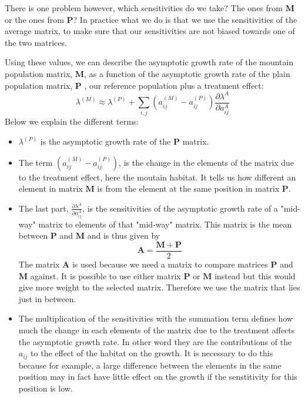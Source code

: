 \documentclass{article}\usepackage[]{graphicx}\usepackage[]{color}
\begin{document}
There is one problem however, which sensitivities do we take? The ones from $\boldsymbol{M}$ or the ones from $\boldsymbol{P}$? In practice what we do is that we use the sensitivities of the average matrix, to make sure that our sensitivities are not biased towards one of the two matrices. 

Using these values, we can describe the asymptotic growth rate of the mountain population matrix, $\boldsymbol{M}$, as a function of the asymptotic growth rate of the plain population matrix, $\boldsymbol{P}$ , our reference population plus a treatment effect:  
\begin{equation}\label{a}
\lambda^{(M)} \approx \lambda^{(P)}+\sum_{i,j}{(a^{(M)}_{ij}-a^{(P)}_{ij})} \frac{ \partial\lambda^{A}}{\partial a^{A}_{ij}}
\end{equation}
Below we explain the different terms:
\begin{itemize}
\item $\lambda^{(P)}$ is the asymptotic growth rate of the $\boldsymbol{P}$ matrix. 
\item The term ${(a^{(M)}_{ij}-a^{(P)}_{ij})}$, is the change in the elements of the matrix due to the treatment effect, here the moutain habitat. It tells us how different an element in matrix $\boldsymbol{M}$ is from the element at the same position in matrix $\boldsymbol{P}$.
\item The last part, $\frac{ \partial\lambda^{A}}{\partial a^{A}_{ij}}$, is the sensitivities of the asymptotic growth rate of a "mid-way" matrix to elements of that "mid-way" matrix. This matrix is the mean between $\boldsymbol{P}$ and $\boldsymbol{M}$ and is thus given by 
\begin{equation}
\boldsymbol{A}=\frac{\boldsymbol{M}+\boldsymbol{P}}{2}
\end{equation}
The matrix $\boldsymbol{A}$ is used because we need a matrix to compare matrices $\boldsymbol{P}$ and $\boldsymbol{M}$ against. It is possible to use either matrix $\boldsymbol{P}$ or $\boldsymbol{M}$ instead but this would give more weight to the selected matrix. Therefore we use the matrix that lies just in between.
\item The multiplication of the sensitivities with the summation term defines how much the change in each elements of the matrix due to the treatment affects the asymptotic growth rate. In other word they are the contributions of the $a_{ij}$ to the effect of the habitat on the growth. It is necessary to do this because for example, a large difference between the elements in the same position may in fact have little effect on the growth if the senstitivity for this position is low. 
\end{itemize}
\end{document}
